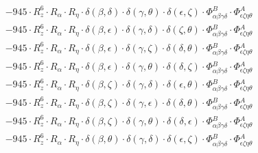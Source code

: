 \documentclass{article}
\begin{document}
\begin{equation}
\begin{array}{c}
 \\[0.2em] 		 - 945 \cdot R_{z}^{6} \cdot R_{\alpha{}} \cdot R_{\eta{}} \cdot \delta{}\left(\beta{}, \delta{}\right) \cdot \delta{}\left(\gamma{}, \theta{}\right) \cdot \delta{}\left(\epsilon{}, \zeta{}\right) \cdot \Phi{}^{B}_{\alpha{}\beta{}\gamma{}\delta{}} \cdot \Phi{}^{A}_{\epsilon{}\zeta{}\eta{}\theta{}} 
 \\[0.2em] 		 - 945 \cdot R_{z}^{6} \cdot R_{\alpha{}} \cdot R_{\eta{}} \cdot \delta{}\left(\beta{}, \epsilon{}\right) \cdot \delta{}\left(\gamma{}, \delta{}\right) \cdot \delta{}\left(\zeta{}, \theta{}\right) \cdot \Phi{}^{B}_{\alpha{}\beta{}\gamma{}\delta{}} \cdot \Phi{}^{A}_{\epsilon{}\zeta{}\eta{}\theta{}} 
 \\[0.2em] 		 - 945 \cdot R_{z}^{6} \cdot R_{\alpha{}} \cdot R_{\eta{}} \cdot \delta{}\left(\beta{}, \epsilon{}\right) \cdot \delta{}\left(\gamma{}, \zeta{}\right) \cdot \delta{}\left(\delta{}, \theta{}\right) \cdot \Phi{}^{B}_{\alpha{}\beta{}\gamma{}\delta{}} \cdot \Phi{}^{A}_{\epsilon{}\zeta{}\eta{}\theta{}} 
 \\[0.2em] 		 - 945 \cdot R_{z}^{6} \cdot R_{\alpha{}} \cdot R_{\eta{}} \cdot \delta{}\left(\beta{}, \epsilon{}\right) \cdot \delta{}\left(\gamma{}, \theta{}\right) \cdot \delta{}\left(\delta{}, \zeta{}\right) \cdot \Phi{}^{B}_{\alpha{}\beta{}\gamma{}\delta{}} \cdot \Phi{}^{A}_{\epsilon{}\zeta{}\eta{}\theta{}} 
 \\[0.2em] 		 - 945 \cdot R_{z}^{6} \cdot R_{\alpha{}} \cdot R_{\eta{}} \cdot \delta{}\left(\beta{}, \zeta{}\right) \cdot \delta{}\left(\gamma{}, \delta{}\right) \cdot \delta{}\left(\epsilon{}, \theta{}\right) \cdot \Phi{}^{B}_{\alpha{}\beta{}\gamma{}\delta{}} \cdot \Phi{}^{A}_{\epsilon{}\zeta{}\eta{}\theta{}} 
 \\[0.2em] 		 - 945 \cdot R_{z}^{6} \cdot R_{\alpha{}} \cdot R_{\eta{}} \cdot \delta{}\left(\beta{}, \zeta{}\right) \cdot \delta{}\left(\gamma{}, \epsilon{}\right) \cdot \delta{}\left(\delta{}, \theta{}\right) \cdot \Phi{}^{B}_{\alpha{}\beta{}\gamma{}\delta{}} \cdot \Phi{}^{A}_{\epsilon{}\zeta{}\eta{}\theta{}} 
 \\[0.2em] 		 - 945 \cdot R_{z}^{6} \cdot R_{\alpha{}} \cdot R_{\eta{}} \cdot \delta{}\left(\beta{}, \zeta{}\right) \cdot \delta{}\left(\gamma{}, \theta{}\right) \cdot \delta{}\left(\delta{}, \epsilon{}\right) \cdot \Phi{}^{B}_{\alpha{}\beta{}\gamma{}\delta{}} \cdot \Phi{}^{A}_{\epsilon{}\zeta{}\eta{}\theta{}} 
 \\[0.2em] 		 - 945 \cdot R_{z}^{6} \cdot R_{\alpha{}} \cdot R_{\eta{}} \cdot \delta{}\left(\beta{}, \theta{}\right) \cdot \delta{}\left(\gamma{}, \delta{}\right) \cdot \delta{}\left(\epsilon{}, \zeta{}\right) \cdot \Phi{}^{B}_{\alpha{}\beta{}\gamma{}\delta{}} \cdot \Phi{}^{A}_{\epsilon{}\zeta{}\eta{}\theta{}} 

\end{array}
\end{equation}
\end{document}
